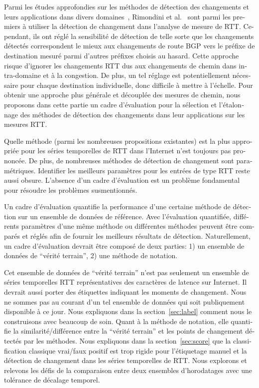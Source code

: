 \begin{otherlanguage}{french}
Parmi les études approfondies sur les méthodes de détection des changements et leurs applications dans divers domaines~\cite{Zhang2007, Reeves2007, Yu2008},
Rimondini et al.~\cite{Rimondini2014} sont parmi les premiers à utiliser la détection de changement dans l'analyse de mesure de RTT.
Cependant, ils ont réglé la sensibilité de détection de telle sorte que 
les changements détectés correspondent le mieux aux changements de route BGP vers le préfixe de destination mesuré 
parmi d'autres préfixes choisis au hasard.
Cette approche risque d'ignorer les changements RTT dus aux changements de chemin dans intra-domaine et à la congestion.
De plus, un tel réglage est potentiellement nécessaire pour chaque destination individuelle, donc difficile à mettre à l'échelle.
Pour obtenir une approche plus générale et découplée des mesures de chemin, 
nous proposons dans cette partie un cadre d'évaluation pour la sélection et l'étalonnage des méthodes de détection des changements 
dans leur applications sur les mesures RTT.

Quelle méthode (parmi les nombreuses propositions existantes) est la plus appropriée 
pour les séries temporelles de RTT dans l'Internet n'est toujours pas prononcée.
De plus, de nombreuses méthodes de détection de changement sont paramétriques.
Identifier les meilleurs paramètres pour les entrées de type RTT reste aussi obsure.
L'absence d'un cadre d'évaluation est un problème fondamental pour résoudre les problèmes susmentionnés.

Un cadre d'évaluation quantifie la performance d'une certaine méthode de détection sur un ensemble de données de référence.
Avec l'évaluation quantifiée, différents paramètres d'une même méthode ou différentes méthodes peuvent être comparés et réglés 
afin de fournir les meilleurs résultats de détection.
Naturellement, un cadre d'évaluation devrait être composé de deux parties: 
1) un ensemble de données de ``vérité terrain'', 2) une méthode de notation.

Cet ensemble de données de ``vérité terrain'' n'est pas seulement un ensemble de séries temporelles RTT 
représentatives des caractères de latence sur Internet.
Il devrait aussi porter des étiquettes indiquant les moments de changement.
Nous ne sommes pas au courant d'un tel ensemble de données qui soit publiquement disponible à ce jour.
Nous expliquons dans la section~\ref{sec:label} comment nous le construisons avec beaucoup de soin.
Quant à la méthode de notation, elle quantifie la similarité/différence entre la ``vérité terrain'' 
et les points de changement détectés par les méthodes.
Nous expliquons dans la section~\ref{sec:score} que la classification classique vrai/faux positif est trop rigide 
pour l'étiquetage manuel et la détection de changement dans les séries temporelles de RTT.
Nous explorons et relevons les défis de la comparaison entre deux ensembles d'horodatages avec une tolérance de décalage temporel.


\end{otherlanguage}
